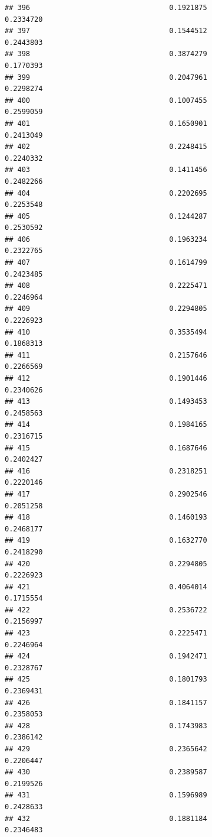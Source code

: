 \documentclass[
  american,
  man,floatsintext]{apa7}
\begin{document}
\begin{verbatim}
## 396                                 0.1921875               0.2334720
## 397                                 0.1544512               0.2443803
## 398                                 0.3874279               0.1770393
## 399                                 0.2047961               0.2298274
## 400                                 0.1007455               0.2599059
## 401                                 0.1650901               0.2413049
## 402                                 0.2248415               0.2240332
## 403                                 0.1411456               0.2482266
## 404                                 0.2202695               0.2253548
## 405                                 0.1244287               0.2530592
## 406                                 0.1963234               0.2322765
## 407                                 0.1614799               0.2423485
## 408                                 0.2225471               0.2246964
## 409                                 0.2294805               0.2226923
## 410                                 0.3535494               0.1868313
## 411                                 0.2157646               0.2266569
## 412                                 0.1901446               0.2340626
## 413                                 0.1493453               0.2458563
## 414                                 0.1984165               0.2316715
## 415                                 0.1687646               0.2402427
## 416                                 0.2318251               0.2220146
## 417                                 0.2902546               0.2051258
## 418                                 0.1460193               0.2468177
## 419                                 0.1632770               0.2418290
## 420                                 0.2294805               0.2226923
## 421                                 0.4064014               0.1715554
## 422                                 0.2536722               0.2156997
## 423                                 0.2225471               0.2246964
## 424                                 0.1942471               0.2328767
## 425                                 0.1801793               0.2369431
## 426                                 0.1841157               0.2358053
## 428                                 0.1743983               0.2386142
## 429                                 0.2365642               0.2206447
## 430                                 0.2389587               0.2199526
## 431                                 0.1596989               0.2428633
## 432                                 0.1881184               0.2346483

\end{verbatim}
\end{document}
